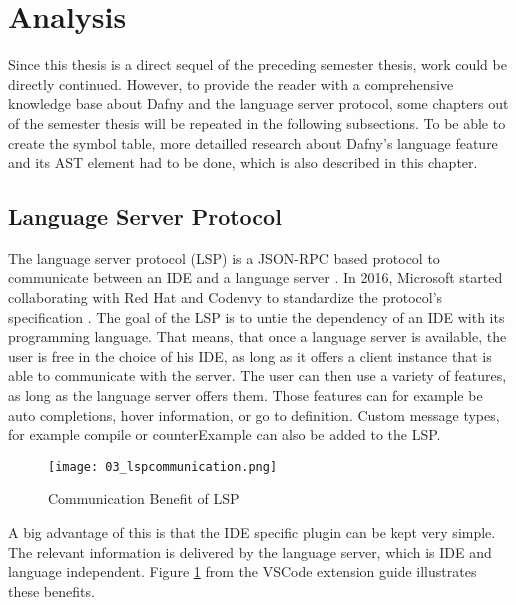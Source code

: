 \section{Analysis}
\label{section:analysis}
Since this thesis is a direct sequel of the preceding semester thesis, work could be directly continued. However, to provide the reader with a comprehensive knowledge base about Dafny and the language server protocol, some chapters out of the semester thesis will be repeated in the following subsections. To be able to create the symbol table, more detailled research about Dafny's language feature and its AST element had to be done, which is also described in this chapter.


\subsection{Language Server Protocol}
\label{section:analysis:lsp}
The language server protocol (LSP) is a JSON-RPC based protocol to communicate between an IDE and a language server \cite{dafnyWiki}. In 2016, Microsoft started collaborating with Red Hat and Codenvy to standardize the protocol’s specification \cite{dafnyWiki}. The goal of the LSP is to untie the dependency of an IDE with its programming language. That means, that once a language server is available, the user is free in the choice of his IDE, as long as it offers a client instance that is able to communicate with the server. The user can then use a variety of features, as long as the language server offers them. Those features can for example be auto completions, hover information, or go to definition. Custom message types, for example compile or counterExample can also be added to the LSP. \cite{dafnyWiki}
\begin{figure}[h]
    \centering
    \texttt{[image: 03\_lspcommunication.png]}
    \caption{Communication Benefit of LSP}
    \label{fig:lspcommunication}
\end{figure}
A big advantage of this is that the IDE specific plugin can be kept very simple. The relevant information is delivered by the language server, which is IDE and language independent. Figure \ref{fig:lspcommunication} from the VSCode extension guide illustrates these benefits. \cite{lspextensionguide}


